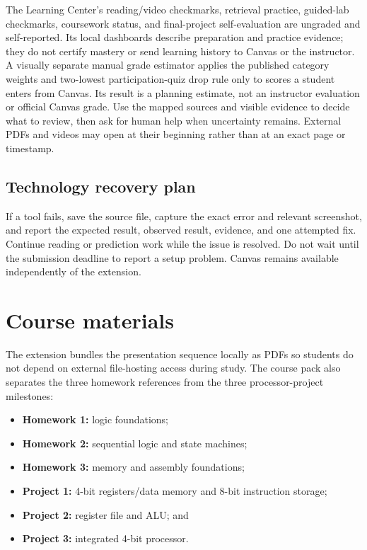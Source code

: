 \documentclass[10pt,letterpaper]{article}
\begin{document}
The Learning Center's reading/video checkmarks, retrieval practice, guided-lab checkmarks, coursework status, and final-project self-evaluation are ungraded and self-reported. Its local dashboards describe preparation and practice evidence; they do not certify mastery or send learning history to Canvas or the instructor. A visually separate manual grade estimator applies the published category weights and two-lowest participation-quiz drop rule only to scores a student enters from Canvas. Its result is a planning estimate, not an instructor evaluation or official Canvas grade. Use the mapped sources and visible evidence to decide what to review, then ask for human help when uncertainty remains. External PDFs and videos may open at their beginning rather than at an exact page or timestamp.

\subsection{Technology recovery plan}

If a tool fails, save the source file, capture the exact error and relevant screenshot, and report the expected result, observed result, evidence, and one attempted fix. Continue reading or prediction work while the issue is resolved. Do not wait until the submission deadline to report a setup problem. Canvas remains available independently of the extension.

\section{Course materials}

The extension bundles the presentation sequence locally as PDFs so students do not depend on external file-hosting access during study. The course pack also separates the three homework references from the three processor-project milestones:

\begin{itemize}
  \item \textbf{Homework 1:} logic foundations;
  \item \textbf{Homework 2:} sequential logic and state machines;
  \item \textbf{Homework 3:} memory and assembly foundations;
  \item \textbf{Project 1:} 4-bit registers/data memory and 8-bit instruction storage;
  \item \textbf{Project 2:} register file and ALU; and
  \item \textbf{Project 3:} integrated 4-bit processor.
\end{itemize}
\end{document}
